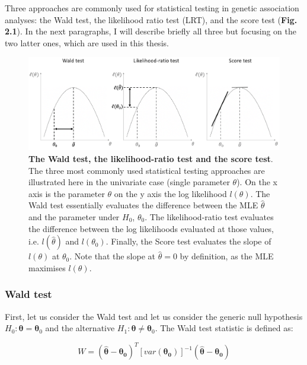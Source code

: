 
\vspace{5mm}

Three approaches are commonly used for statistical testing in genetic association analyses: the Wald test, the likelihood ratio test (LRT), and the score test (\textbf{Fig. 2.1}).
In the next paragraphs, I will describe briefly all three but focusing on the two latter ones, which are used in this thesis.

\begin{figure}[h]
\centering
\includegraphics[width=15cm]{Chapter2/Fig/wald_lrt_score_tests.png}
\caption{\textbf{The Wald test, the likelihood-ratio test and the score test}.\\
The three most commonly used statistical testing approaches are illustrated here in the univariate case (single parameter $\theta$). 
On the x axis is the parameter $\theta$ on the y axis the log likelihood $\mathit{l}(\theta)$.
The Wald test essentially evaluates the difference between the MLE $\hat{\theta}$ and the parameter under $H_0$, $\theta_0$.
The likelihood-ratio test evaluates the difference between the log likelihoods evaluated at those values, i.e. $\mathit{l}(\hat{\theta})$ and $\mathit{l}(\theta_0)$.
Finally, the Score test evaluates the slope of $\mathit{l}(\theta)$ at $\theta_0$. Note that the slope at $\hat{\theta}=0$ by definition, as the MLE maximises $\mathit{l}(\theta)$.}
\end{figure}

\subsubsection{Wald test}

First, let us consider the Wald test and let us consider the generic null hypothesis $H_0: \boldsymbol{\theta} = \boldsymbol{\theta}_0$ and the alternative $H_1: \boldsymbol{\theta} \neq \boldsymbol{\theta}_0$.
The Wald test statistic is defined as:

\begin{equation}
W = (\hat{\boldsymbol{\theta}}-\boldsymbol{\theta_0})^T [var(\boldsymbol{\theta_0})]^{-1}(\hat{\boldsymbol{\theta}}-\boldsymbol{\theta_0}) 
\end{equation}

